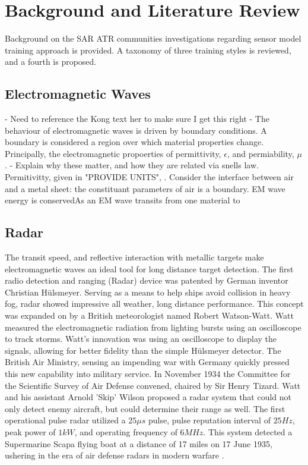 \chapter{Background and Literature Review}
\label{ch:background}
\glsresetall
{



Background on the \gls{SAR} \gls{ATR} communities investigations regarding sensor model training approach is provided. A taxonomy of three training styles is reviewed, and a fourth is proposed.



}

\section{Electromagnetic Waves}

- Need to reference the Kong text her to make sure I get this right
- The behaviour of electromagnetic waves is driven by boundary conditions. A boundary is considered a region over which material properties change. Principally, the electromagnetic propoerties of permittivity, $\epsilon$, and permiability, $\mu$.
- Explain why these matter, and how they are related via snells law. Permitivitty, given in "PROVIDE UNITS", . Consider the interface between air and a metal sheet:  the constituant parameters of air is a boundary. EM wave energy is conservedAs an EM wave transits from one material to

\section{Radar}
\label{sec:RD}


The transit speed, and reflective interaction with metallic targets make electromagnetic waves an ideal tool for long distance target detection. The first radio detection and ranging (Radar) device was patented by German inventor Christian H{\"u}lsmeyer. Serving as a means to help ships avoid collision in heavy fog, radar showed impressive all weather, long distance performance. This concept was expanded on by a British meteorologist named Robert Watson-Watt. Watt measured the electromagnetic radiation from lighting bursts using an oscilloscope to track storms. Watt's innovation was using an oscilloscope to display the signals, allowing for better fidelity than the simple H{\"u}lsmeyer detector. The British Air Ministry, sensing an impending war with Germany quickly pressed this new capability into military service. In November 1934 the Committee for the Scientific Survey of Air Defense convened, chaired by Sir Henry Tizard. Watt and his assistant Arnold 'Skip' Wilson proposed a radar system that could not only detect enemy aircraft, but could determine their range as well. The first operational pulse radar utilized a $25 \mu s$ pulse, pulse reputation interval of $25 Hz$, peak power of $1 kW$, and operating frequency of $6 MHz$. This system detected a Supermarine Scapa flying boat at a distance of 17 miles on 17 June 1935, ushering in the era of air defense radars in modern warfare \cite{Bowen}.

